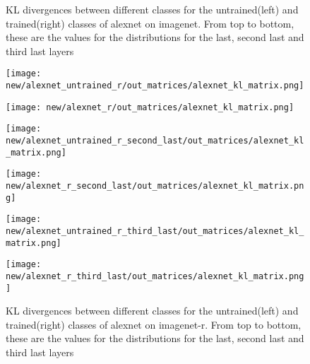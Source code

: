 \documentclass{article}
\begin{document}
\begin{figure}[H]
                \caption{KL divergences between different classes for the untrained(left) and trained(right) classes of alexnet on imagenet. From top to bottom, these are the values for the distributions for the last, second last and third last layers}
                \label{fig:kl_divergences_imgr}
            \end{figure}
            
            \begin{figure}[H]
                \centering
                \begin{minipage}{0.45\textwidth}
                    \centering
                    \texttt{[image: new/alexnet\_untrained\_r/out\_matrices/alexnet\_kl\_matrix.png]}
                    
                \end{minipage}\hfill
                \begin{minipage}{0.45\textwidth}
                    \centering
                    \texttt{[image: new/alexnet\_r/out\_matrices/alexnet\_kl\_matrix.png]}
                \end{minipage}
                \begin{minipage}{0.45\textwidth}
                    \centering
                    \texttt{[image: new/alexnet\_untrained\_r\_second\_last/out\_matrices/alexnet\_kl\_matrix.png]}
                    
                \end{minipage}\hfill
                \begin{minipage}{0.45\textwidth}
                    \centering
                    \texttt{[image: new/alexnet\_r\_second\_last/out\_matrices/alexnet\_kl\_matrix.png]}
                \end{minipage}
                
                \begin{minipage}{0.45\textwidth}
                    \centering
                    \texttt{[image: new/alexnet\_untrained\_r\_third\_last/out\_matrices/alexnet\_kl\_matrix.png]}
                    
                \end{minipage}\hfill
                \begin{minipage}{0.45\textwidth}
                    \centering
                    \texttt{[image: new/alexnet\_r\_third\_last/out\_matrices/alexnet\_kl\_matrix.png]}
                \end{minipage}
                
                \caption{KL divergences between different classes for the untrained(left) and trained(right) classes of alexnet on imagenet-r. From top to bottom, these are the values for the distributions for the last, second last and third last layers}
                \label{fig:kl_divergences_r}

            \end{figure}
\end{document}
